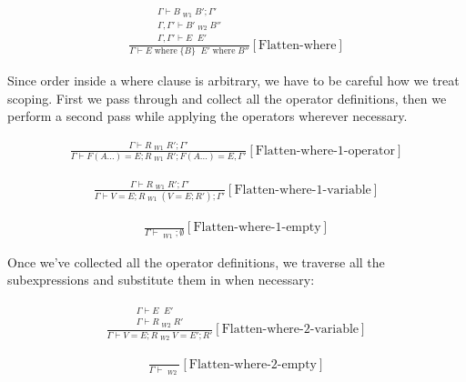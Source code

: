 \documentclass{scrartcl}
\DeclareMathOperator{\where}{where}
\DeclareMathOperator{\flattenrel}{\overset{flatten}{\Rightarrow}}
\begin{document}
    \begin{align*}
    \frac{
        \begin{matrix}
        \Gamma \vdash B \flattenrel_{W1} B'; \Gamma' \\
        \Gamma, \Gamma' \vdash B' \flattenrel_{W2} B'' \\
        \Gamma, \Gamma' \vdash E \flattenrel E'
        \end{matrix}
    }{
        \Gamma \vdash E \where \{ B \} \flattenrel E' \where B''
    }[\text{Flatten-where}]
    \end{align*}
    
    Since order inside a where clause is arbitrary, we have to be careful how we treat scoping. First we pass through and collect all the operator definitions, then we perform a second pass while applying the operators wherever necessary.
    
    \begin{align*}
    \frac{
        \Gamma \vdash R \flattenrel_{W1} R'; \Gamma'
    }{
        \Gamma \vdash F(A...) = E; R \flattenrel_{W1} R'; F(A...) = E, \Gamma'
    }[\text{Flatten-where-1-operator}]
    \end{align*}
    
    \begin{align*}
    \frac{
        \Gamma \vdash R \flattenrel_{W1} R'; \Gamma'
    }{
        \Gamma \vdash V = E; R \flattenrel_{W1} (V = E; R'); \Gamma'
    }[\text{Flatten-where-1-variable}]
    \end{align*}
    
    \begin{align*}
    \frac{}{
        \Gamma \vdash \flattenrel_{W1} ; \emptyset
    }[\text{Flatten-where-1-empty}]
    \end{align*}
    
    Once we've collected all the operator definitions, we traverse all the subexpressions and substitute them in when necessary:
    
    \begin{align*}
    \frac{
        \begin{matrix}
        \Gamma \vdash E \flattenrel E' \\
        \Gamma \vdash R \flattenrel_{W2} R'
        \end{matrix}
    }{
        \Gamma \vdash V = E; R \flattenrel_{W2} V = E'; R'
    }[\text{Flatten-where-2-variable}]
    \end{align*}
    
    \begin{align*}
    \frac{}{
        \Gamma \vdash \flattenrel_{W2}
    }[\text{Flatten-where-2-empty}]
    \end{align*}
    
\end{document}
